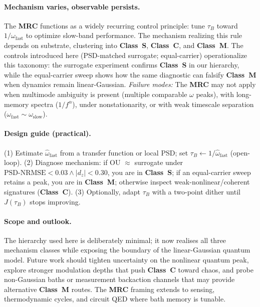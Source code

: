 \documentclass[11pt,letterpaper]{article}
\DeclareRobustCommand{\mrc}{\textbf{MRC}\xspace}
\DeclareRobustCommand{\classS}{\textbf{Class~S}\xspace}
\DeclareRobustCommand{\classC}{\textbf{Class~C}\xspace}
\DeclareRobustCommand{\classM}{\textbf{Class~M}\xspace}
\DeclareRobustCommand{\GatePSD}{\ensuremath{\text{PSD-NRMSE}<0.03}\xspace}
\DeclareRobustCommand{\GateDZ}{\ensuremath{\lvert d_z\rvert<0.30}\xspace}
\DeclareRobustCommand{\GateEQ}{\ensuremath{\GatePSD \wedge \GateDZ}\xspace}
\begin{document}
\paragraph*{Mechanism varies, observable persists.}
The \mrc functions as a widely recurring control principle: tune $\tau_B$ toward $1/\omega_{\mathrm{fast}}$ to optimize slow-band performance. The mechanism realizing this rule depends on substrate, clustering into \classS{}, \classC{}, and \classM{}. The controls introduced here (PSD-matched surrogate; equal-carrier) operationalize this taxonomy: the surrogate experiment confirms \classS{} in our hierarchy, while the equal-carrier sweep shows how the same diagnostic can falsify \classM{} when dynamics remain linear-Gaussian. \emph{Failure modes:} The \mrc may not apply when multimode ambiguity is present (multiple comparable $\omega$ peaks), with long-memory spectra ($1/f^\alpha$), under nonstationarity, or with weak timescale separation ($\omega_{\mathrm{fast}}\sim\omega_{\mathrm{slow}}$).

\paragraph*{Design guide (practical).}
(1) Estimate $\hat{\omega}_{\mathrm{fast}}$ from a transfer function or local PSD; set $\tau_B\leftarrow 1/\hat{\omega}_{\mathrm{fast}}$ (open-loop).
(2) Diagnose mechanism: if OU $\approx$ surrogate under \GateEQ, you are in \classS; if an equal-carrier sweep retains a peak, you are in \classM; otherwise inspect weak-nonlinear/coherent signatures (\classC).
(3) Optionally, adapt $\tau_B$ with a two-point dither until $J(\tau_B)$ stops improving.

\paragraph*{Scope and outlook.}
The hierarchy used here is deliberately minimal; it now realises all three mechanism classes while exposing the boundary of the linear-Gaussian quantum model. Future work should tighten uncertainty on the nonlinear quantum peak, explore stronger modulation depths that push \classC{} toward chaos, and probe non-Gaussian baths or measurement backaction channels that may provide alternative \classM{} routes. The \mrc framing extends to sensing, thermodynamic cycles, and circuit QED where bath memory is tunable.
\end{document}
